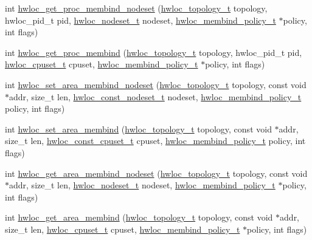 \begin{DoxyCompactItemize}
\item 
 int \hyperlink{a00050_ga22074ed072e1039f74f17f7b16e9e39d}{hwloc\_\-get\_\-proc\_\-membind\_\-nodeset} (\hyperlink{a00039_ga9d1e76ee15a7dee158b786c30b6a6e38}{hwloc\_\-topology\_\-t} topology, hwloc\_\-pid\_\-t pid, \hyperlink{a00040_ga37e35730fa7e775b5bb0afe893d6d508}{hwloc\_\-nodeset\_\-t} nodeset, \hyperlink{a00050_gac9764f79505775d06407b40f5e4661e8}{hwloc\_\-membind\_\-policy\_\-t} $\ast$policy, int flags)
\item 
 int \hyperlink{a00050_gabaf9c13f1fa301d6895594cec52226e2}{hwloc\_\-get\_\-proc\_\-membind} (\hyperlink{a00039_ga9d1e76ee15a7dee158b786c30b6a6e38}{hwloc\_\-topology\_\-t} topology, hwloc\_\-pid\_\-t pid, \hyperlink{a00040_ga4bbf39b68b6f568fb92739e7c0ea7801}{hwloc\_\-cpuset\_\-t} cpuset, \hyperlink{a00050_gac9764f79505775d06407b40f5e4661e8}{hwloc\_\-membind\_\-policy\_\-t} $\ast$policy, int flags)
\item 
 int \hyperlink{a00050_gade5e2c28ea8475a479bf2b1df36c6ccd}{hwloc\_\-set\_\-area\_\-membind\_\-nodeset} (\hyperlink{a00039_ga9d1e76ee15a7dee158b786c30b6a6e38}{hwloc\_\-topology\_\-t} topology, const void $\ast$addr, size\_\-t len, \hyperlink{a00040_ga2f5276235841ad66a79bedad16a5a10c}{hwloc\_\-const\_\-nodeset\_\-t} nodeset, \hyperlink{a00050_gac9764f79505775d06407b40f5e4661e8}{hwloc\_\-membind\_\-policy\_\-t} policy, int flags)
\item 
 int \hyperlink{a00050_ga06594edeb4728cb9e014aed924d1e74a}{hwloc\_\-set\_\-area\_\-membind} (\hyperlink{a00039_ga9d1e76ee15a7dee158b786c30b6a6e38}{hwloc\_\-topology\_\-t} topology, const void $\ast$addr, size\_\-t len, \hyperlink{a00040_ga1f784433e9b606261f62d1134f6a3b25}{hwloc\_\-const\_\-cpuset\_\-t} cpuset, \hyperlink{a00050_gac9764f79505775d06407b40f5e4661e8}{hwloc\_\-membind\_\-policy\_\-t} policy, int flags)
\item 
 int \hyperlink{a00050_ga106e6fcd764d17be682faf7a5bc95720}{hwloc\_\-get\_\-area\_\-membind\_\-nodeset} (\hyperlink{a00039_ga9d1e76ee15a7dee158b786c30b6a6e38}{hwloc\_\-topology\_\-t} topology, const void $\ast$addr, size\_\-t len, \hyperlink{a00040_ga37e35730fa7e775b5bb0afe893d6d508}{hwloc\_\-nodeset\_\-t} nodeset, \hyperlink{a00050_gac9764f79505775d06407b40f5e4661e8}{hwloc\_\-membind\_\-policy\_\-t} $\ast$policy, int flags)
\item 
 int \hyperlink{a00050_gac02ee8f7606382ea7855ae4e1656ed0f}{hwloc\_\-get\_\-area\_\-membind} (\hyperlink{a00039_ga9d1e76ee15a7dee158b786c30b6a6e38}{hwloc\_\-topology\_\-t} topology, const void $\ast$addr, size\_\-t len, \hyperlink{a00040_ga4bbf39b68b6f568fb92739e7c0ea7801}{hwloc\_\-cpuset\_\-t} cpuset, \hyperlink{a00050_gac9764f79505775d06407b40f5e4661e8}{hwloc\_\-membind\_\-policy\_\-t} $\ast$policy, int flags)

\end{DoxyCompactItemize}
